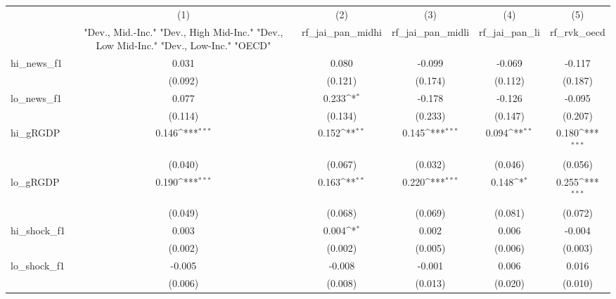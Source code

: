 {
\def\sym#1{\ifmmode^{#1}\else\(^{#1}\)\fi}
\begin{tabular}{l*{5}{c}}
\toprule
            &\multicolumn{1}{c}{(1)}&\multicolumn{1}{c}{(2)}&\multicolumn{1}{c}{(3)}&\multicolumn{1}{c}{(4)}&\multicolumn{1}{c}{(5)}\\
            &\multicolumn{1}{c}{ "Dev., Mid.-Inc." "Dev., High Mid-Inc." "Dev., Low Mid-Inc." "Dev., Low-Inc." "OECD" }&\multicolumn{1}{c}{rf\_jai\_pan\_midhi}&\multicolumn{1}{c}{rf\_jai\_pan\_midli}&\multicolumn{1}{c}{rf\_jai\_pan\_li}&\multicolumn{1}{c}{rf\_rvk\_oecd}\\
\midrule
hi\_news\_f1  &       0.031         &       0.080         &      -0.099         &      -0.069         &      -0.117         \\
            &     (0.092)         &     (0.121)         &     (0.174)         &     (0.112)         &     (0.187)         \\
\addlinespace
lo\_news\_f1  &       0.077         &       0.233\sym{*}  &      -0.178         &      -0.126         &      -0.095         \\
            &     (0.114)         &     (0.134)         &     (0.233)         &     (0.147)         &     (0.207)         \\
\addlinespace
hi\_gRGDP    &       0.146\sym{***}&       0.152\sym{**} &       0.145\sym{***}&       0.094\sym{**} &       0.180\sym{***}\\
            &     (0.040)         &     (0.067)         &     (0.032)         &     (0.046)         &     (0.056)         \\
\addlinespace
lo\_gRGDP    &       0.190\sym{***}&       0.163\sym{**} &       0.220\sym{***}&       0.148\sym{*}  &       0.255\sym{***}\\
            &     (0.049)         &     (0.068)         &     (0.069)         &     (0.081)         &     (0.072)         \\
\addlinespace
hi\_shock\_f1 &       0.003         &       0.004\sym{*}  &       0.002         &       0.006         &      -0.004         \\
            &     (0.002)         &     (0.002)         &     (0.005)         &     (0.006)         &     (0.003)         \\
\addlinespace
lo\_shock\_f1 &      -0.005         &      -0.008         &      -0.001         &       0.006         &       0.016         \\
            &     (0.006)         &     (0.008)         &     (0.013)         &     (0.020)         &     (0.010)         \\

\end{tabular}}
